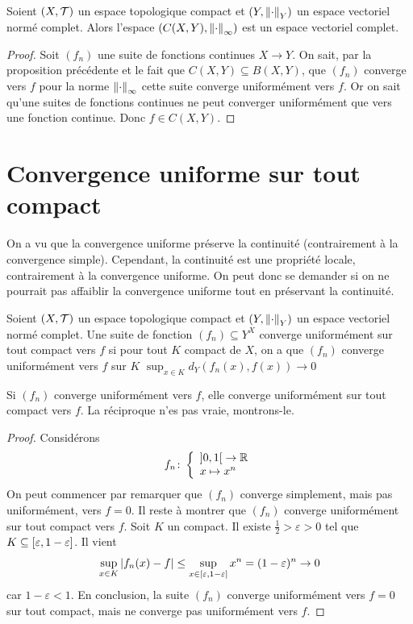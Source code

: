 \begin{proposition}
    Soient $(X,\mathcal{T})$ un espace topologique compact et $(Y,\left\| \cdot \right\|_Y)$ un espace vectoriel normé complet. Alors l'espace $(C(X,Y),\left\| \cdot \right\|_\infty)$ est un espace vectoriel complet. 
\end{proposition}
\begin{proof}
    Soit $(f_n)$ une suite de fonctions continues $X\to Y$. On sait, par la proposition précédente et le fait que $C(X,Y)\subseteq B(X,Y)$, que $(f_n)$ converge vers $f$ pour la norme $\left\| \cdot \right\|_\infty$ \ie cette suite converge uniformément vers $f$. Or on sait qu'une suites de fonctions continues ne peut converger uniformément que vers une fonction continue. Donc $f\in C(X,Y)$.
\end{proof}
\section{Convergence uniforme sur tout compact}
On a vu que la convergence uniforme préserve la continuité (contrairement à la convergence simple). Cependant, la continuité est une propriété locale, contrairement à la convergence uniforme. On peut donc se demander si on ne pourrait pas affaiblir la convergence uniforme tout en préservant la continuité.
\begin{definition}
     Soient $(X,\mathcal{T})$ un espace topologique compact et $(Y,\left\| \cdot \right\|_Y)$ un espace vectoriel normé complet. Une suite de fonction $(f_n)\subseteq Y^X$ converge uniformément sur tout compact vers $f$ si pour tout $K$ compact de $X$, on a que $(f_n)$ converge uniformément vers $f$ sur $K$ \ie $\sup_{x\in K}d_Y(f_n(x),f(x))\to 0$
\end{definition}
\begin{remarque}
    Si $(f_n)$ converge uniformément vers $f$, elle converge uniformément sur tout compact vers $f$. La réciproque n'es pas vraie, montrons-le.
\end{remarque}
\begin{proof}
    Considérons $$f_n\colon \left\{\begin{array}{l}\left] 0,1\right[\to \mathbb{R} \\x\mapsto x^n\end{array}\right.$$On peut commencer par remarquer que $(f_n)$ converge simplement, mais pas uniformément, vers $f=0$. Il reste à montrer que $(f_n)$ converge uniformément sur tout compact vers $f$. Soit $K$ un compact. Il existe $\frac{1}{2}>\varepsilon>0$ tel que $K\subseteq\left[ \varepsilon,1-\varepsilon\right]$. Il vient $$\sup_{x\in K}\left| f_n(x)-f \right|\le \sup_{x\in\left[ \varepsilon,1-\varepsilon\right]}x^n = (1-\varepsilon)^n\to 0$$ car $1-\varepsilon<1$. En conclusion, la suite $(f_n)$ converge uniformément vers $f = 0$ sur tout compact, mais ne converge pas uniformément vers $f$.
\end{proof}
